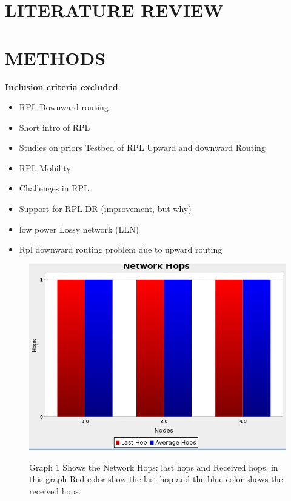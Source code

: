 \documentclass[12pt,journal,comsoc, letterpaper, twocolumn]{IEEEtran}
\begin{document}
 





\section{LITERATURE REVIEW}





\section{METHODS}



 


 \textbf{ Inclusion criteria excluded}
 \newline


\begin{itemize}  
\item RPL Downward routing
\item	Short intro of RPL 
\item	Studies on priors Testbed of RPL Upward and downward Routing
\item	RPL Mobility 
\item Challenges in RPL 
\item	Support for RPL DR (improvement, but why)
\item	low power Lossy network (LLN)
\item	Rpl downward routing problem due to upward routing 
\newline


\end{itemize} 






\begin{figure}
\begin{center}
\includegraphics[width=0.7\textwidth=0.5]{RPL1}

Graph 1 Shows the Network Hops: last hops and Received hops. in this graph Red color show the last hop and the blue color shows the received hops. 

\end{center}
\end{figure}
 
\end{document}

